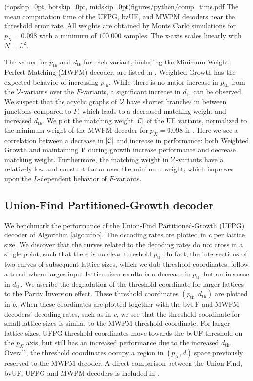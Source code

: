 \Figure[t](topskip=0pt, botskip=0pt, midskip=0pt){figures/python/comp_time.pdf}{
  The mean computation time of the UFPG, bvUF, and MWPM decoders near the threshold error rate. All weights are obtained by Monte Carlo simulations for $p_X=0.098$ with a minimum of $100.000$ samples. The x-axis scales linearly with $N = L^2$.\label{comp_time}}

The values for $p_{\text{th}}$ and $d_{\text{th}}$ for each variant, including the Minimum-Weight Perfect Matching (MWPM) decoder, are listed in . Weighted Growth has the expected behavior of increasing $p_{\text{th}}$. While there is no major increase in $p_{\text{th}}$ from the $\mathcal{V}$-variants over the $F$-variants, a significant increase in $d_{\text{th}}$ can be observed. We suspect that the acyclic graphs of $\mathcal{V}$ have shorter branches in between junctions compared to $F$, which leads to a decreased matching weight and increased $d_{\text{th}}$. We plot the matching weight $\lvert\mathcal{C}\rvert$ of the UF variants, normalized to the minimum weight of the MWPM decoder for $p_X = 0.098$ in . Here we see a correlation between a decrease in $\lvert\mathcal{C}\rvert$ and increase in performance: both Weighted Growth and maintaining $\mathcal{V}$ during growth increase performance and decrease matching weight. Furthermore, the matching weight in $\mathcal{V}$-variants have a relatively low and constant factor over the minimum weight, which improves upon the $L$-dependent behavior of $F$-variants.


\subsection{Union-Find Partitioned-Growth decoder}

We benchmark the performance of the Union-Find Partitioned-Growth (UFPG) decoder of Algorithm \ref{algo:ufbb}. The decoding rates are plotted in \emph{a} per lattice size. We discover that the curves related to the decoding rates do not cross in a single point, such that there is no clear threshold $p_{\text{th}}$. In fact, the intersections of two curves of subsequent lattice sizes, which we dub threshold coordinates, follow a trend where larger input lattice sizes results in a decrease in $p_{\text{th}}$ but an increase in $d_{\text{th}}$. We ascribe the degradation of the threshold coordinate for larger lattices to the Parity Inversion effect. These threshold coordinates $(p_{\text{th}}, d_{\text{th}})$ are plotted in \emph{b}. When these coordinates are plotted together with the bvUF and MWPM decoders' decoding rates, such as in \emph{c}, we see that the threshold coordinate for small lattice sizes is similar to the MWPM threshold coordinate. For larger lattice sizes, UFPG threshold coordinates move towards the bvUF threshold on the $p_X$ axis, but still has an increased performance due to the increased $d_{\text{th}}$. Overall, the threshold coordinates occupy a region in $(p_X, d)$ space previously reserved to the MWPM decoder. A direct comparison between the Union-Find, bvUF, UFPG and MWPM decoders is included in .

